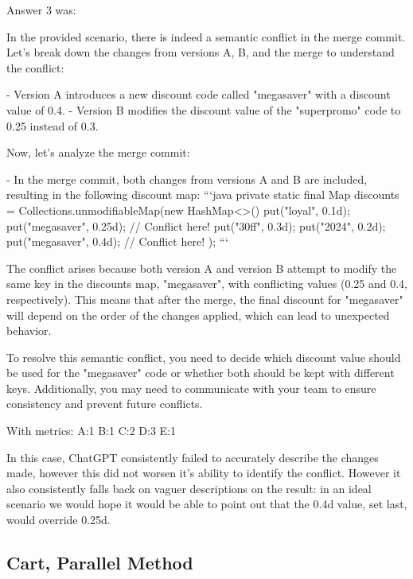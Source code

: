 Answer 3 was:
\begin{spverbatim}
In the provided scenario, there is indeed a semantic conflict in the merge commit. Let's break down the changes from versions A, B, and the merge to understand the conflict:

- Version A introduces a new discount code called "megasaver" with a discount value of 0.4.
- Version B modifies the discount value of the "superpromo" code to 0.25 instead of 0.3.

Now, let's analyze the merge commit:

- In the merge commit, both changes from versions A and B are included, resulting in the following discount map:
```java
private static final Map discounts = Collections.unmodifiableMap(new HashMap<>() {{
    put("loyal", 0.1d);
    put("megasaver", 0.25d); // Conflict here!
    put("30ff", 0.3d);
    put("2024", 0.2d);
    put("megasaver", 0.4d); // Conflict here!
}});
```

The conflict arises because both version A and version B attempt to modify the same key in the discounts map, "megasaver", with conflicting values (0.25 and 0.4, respectively). This means that after the merge, the final discount for "megasaver" will depend on the order of the changes applied, which can lead to unexpected behavior.

To resolve this semantic conflict, you need to decide which discount value should be used for the "megasaver" code or whether both should be kept with different keys. Additionally, you may need to communicate with your team to ensure consistency and prevent future conflicts.
\end{spverbatim}

With metrics:
A:1
B:1
C:2
D:3
E:1

In this case, ChatGPT consistently failed to accurately describe the changes made, however this did not worsen it's ability to identify the conflict. However it also consistently falls back on vaguer descriptions on the result: in an ideal scenario we would hope it would be able to point out that the 0.4d value, set last, would override 0.25d.

\subsection{Cart, Parallel Method}

